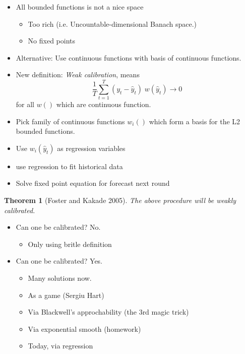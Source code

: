 \documentclass[landscape]{slides}
\newtheorem{theorem}{Theorem}
\begin{document}
\begin{itemize}
\item All bounded functions is not a nice space
\begin{itemize}
\item Too rich (i.e.  Uncountable-dimensional Banach space.)
\item No fixed points
\end{itemize}
\item Alternative: Use continuous functions with basis of continuous functions.
\item New definition: {\em Weak calibration}, means 
\begin{displaymath}
\frac{1}{T} \sum_{t=1}^T (y_t - \hat{y}_t) \; w(\hat{y}_t) \to 0
\end{displaymath}
for all $w()$ which are continuous function.
\end{itemize}


\begin{itemize}
\item Pick family of continuous functions $w_i()$ which form a basis
for the L2 bounded functions. 
\item Use $w_i(\hat{y}_t)$ as regression variables
\item use regression to fit historical data
\item Solve fixed point equation for forecast next round
\end{itemize}
\begin{theorem}[Foster and Kakade 2005]
The above procedure will be weakly calibrated.
\end{theorem}



\begin{itemize}

\item Can one be calibrated? No.
\begin{itemize}
\item Only using britle definition
\end{itemize}
\item Can one be calibrated? Yes.
\begin{itemize}
\item Many solutions now.
\item As a game (Sergiu Hart)
\item Via Blackwell's approchability (the 3rd magic trick)
\item Via exponential smooth (homework)
\item Today, via regression
\end{itemize}
\end{itemize}

\end{document}
